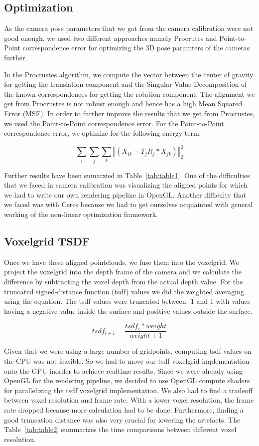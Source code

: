 \documentclass[10pt,twocolumn,letterpaper]{article}
\begin{document}
\subsection{Optimization}
As the camera pose parameters that we got from the camera calibration were not good enough, we used two different approaches namely Procrutes and Point-to-Point correspondence error for optimizing the 3D pose paramters of the cameras further.
 
In the Procrustes algorithm, we compute the vector between the center of gravity for getting the translation component and the Singular Value Decomposition of the known correspondences for getting the rotation component. The alignment we get from Procrustes is not robust enough and hence has a high Mean Squared Error (MSE). In order to further improve the results that we get from Procrustes, we used the Point-to-Point correspondence error. For the Point-to-Point correspondence error, we optimize for the following energy term:

$$
\sum_{i}\sum_{j}\sum_{k} \left\Vert\left(X_{ik} - T_jR_j*X_{jk}\right)\right\Vert_2^2
$$

Further results have been sumarzied in Table~\ref{tab:table1}. One of the difficulties that we faced in camera calibration was visualizing the aligned points for which we had to write our own rendering pipeline in OpenGL. Another difficulty that we faced was with Ceres because we had to get ourselves acquainted with general working of the non-linear optimization framework. 
\subsection{Voxelgrid TSDF}
Once we have these aligned pointclouds, we fuse them into the voxelgrid. We project the voxelgrid into the depth frame of the camera and we calculate the difference  by subtracting the voxel depth from the actual depth value. For the truncated signed-distance function (tsdf) values we did the weighted averaging using the equation. The tsdf values were truncated between -1 and 1 with values having a negative value inside the surface and positive values outside the surface.

$$
tsdf_{i+1}=\frac{tsdf_{i} * weight}{weight+1}
$$

Given that we were using a large number of gridpoints, computing tsdf values on the CPU was not feasible. So we had to move our tsdf voxelgrid implementation onto the GPU inorder to achieve realtime results. Since we were already using OpenGL for the rendering pipeline, we decided to use OpenGL compute shaders for parallelizing the tsdf voxelgrid implementation. We also had to find a tradeoff between voxel resolution and frame rate. With a lower voxel resolution, the frame rate dropped because more calculation had to be done. Furthermore, finding a good truncation distance was also very crucial for lowering the artefacts. The Table~\ref{tab:table2} summarizes the time comparisons between different voxel resolution. 
\end{document}
